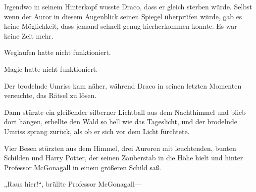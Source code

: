 Irgendwo in seinem Hinterkopf wusste Draco, dass er gleich sterben würde. Selbst wenn der Auror in diesem Augenblick seinen Spiegel überprüfen würde, gab es keine Möglichkeit, dass jemand schnell genug hierherkommen konnte. Es war keine Zeit mehr.

Weglaufen hatte nicht funktioniert.

Magie hatte nicht funktioniert.

Der brodelnde Umriss kam näher, während Draco in seinen letzten Momenten versuchte, das Rätsel zu lösen.

Dann stürzte ein gleißender silberner Lichtball aus dem Nachthimmel und blieb dort hängen, erhellte den Wald so hell wie das Tageslicht, und der brodelnde Umriss sprang zurück, als ob er sich vor dem Licht fürchtete.

Vier Besen stürzten aus dem Himmel, drei Auroren mit leuchtenden, bunten Schilden und Harry Potter, der seinen Zauberstab in die Höhe hielt und hinter Professor McGonagall in einem größeren Schild saß.

„Raus hier!“, brüllte Professor McGonagall—

